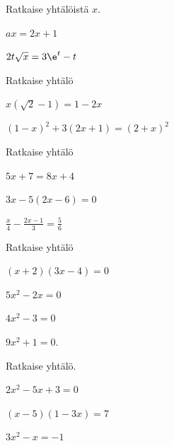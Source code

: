 

\begin{tehtava}
Ratkaise yhtälöistä \(x\).
\begin{kohdat}
\item \(ax = 2x + 1\)
\item \(2t\sqrt{x} = 3\e^t - t\)
\end{kohdat}
\end{tehtava}

\begin{tehtava}
Ratkaise yhtälö
\begin{kohdat}
\item \( x(\sqrt{2} - 1) = 1 - 2x \)
\item \( (1-x)^2 + 3(2x+1) = (2+x)^2 \)
\end{kohdat}
\end{tehtava}

\begin{tehtava}
Ratkaise yhtälö
\begin{kohdat}
\item \( 5x + 7 = 8x + 4 \)
\item \( 3x - 5(2x - 6) = 0 \)
\item \(\displaystyle \frac{x}{4} - \frac{2x-1}{3} = \frac{5}{6}\)
\end{kohdat}
\end{tehtava}

\begin{tehtava}
Ratkaise yhtälö
\begin{kohdat}
\item \((x + 2)(3x - 4) = 0\)
\item \(5x^2 - 2x = 0\)
\item \(4x^2 - 3 = 0\)
\item \(9x^2 + 1 = 0.\)
\end{kohdat}
\end{tehtava}

\begin{tehtava}
Ratkaise yhtälö.
\begin{kohdat}
\item \(2x^2 - 5x + 3 = 0\)
\item \((x - 5)(1 - 3x) = 7\)
\item \(3x^2 - x = -1\)
\end{kohdat}
\end{tehtava}

